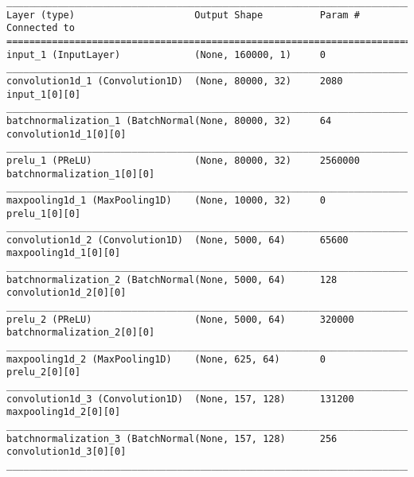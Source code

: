 \begin{lstlisting}[basicstyle=\tiny,frame=single]
____________________________________________________________________________________________________  
Layer (type)                     Output Shape          Param #     Connected to                       
====================================================================================================  
input_1 (InputLayer)             (None, 160000, 1)     0                                              
____________________________________________________________________________________________________  
convolution1d_1 (Convolution1D)  (None, 80000, 32)     2080        input_1[0][0]                      
____________________________________________________________________________________________________  
batchnormalization_1 (BatchNormal(None, 80000, 32)     64          convolution1d_1[0][0]              
____________________________________________________________________________________________________  
prelu_1 (PReLU)                  (None, 80000, 32)     2560000     batchnormalization_1[0][0]         
____________________________________________________________________________________________________  
maxpooling1d_1 (MaxPooling1D)    (None, 10000, 32)     0           prelu_1[0][0]                      
____________________________________________________________________________________________________  
convolution1d_2 (Convolution1D)  (None, 5000, 64)      65600       maxpooling1d_1[0][0]               
____________________________________________________________________________________________________  
batchnormalization_2 (BatchNormal(None, 5000, 64)      128         convolution1d_2[0][0]              
____________________________________________________________________________________________________  
prelu_2 (PReLU)                  (None, 5000, 64)      320000      batchnormalization_2[0][0]         
____________________________________________________________________________________________________  
maxpooling1d_2 (MaxPooling1D)    (None, 625, 64)       0           prelu_2[0][0]                      
____________________________________________________________________________________________________  
convolution1d_3 (Convolution1D)  (None, 157, 128)      131200      maxpooling1d_2[0][0]               
____________________________________________________________________________________________________  
batchnormalization_3 (BatchNormal(None, 157, 128)      256         convolution1d_3[0][0]              
____________________________________________________________________________________________________

\end{lstlisting}
